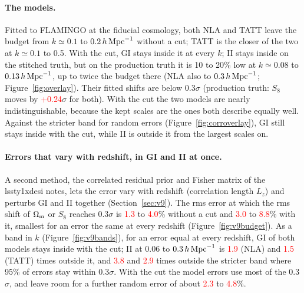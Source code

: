 \documentclass[11pt]{article}
\newcommand{\hMpc}{\,h\,{\rm Mpc}^{-1}}
\newcommand{\Om}{\Omega_{\rm m}}
\newif\ifnumbersfinal
\newcommand{\refresh}[1]{\ifnumbersfinal#1\else\textcolor{red}{#1}\fi}
\newcommand{\ProdNLAS}{\refresh{+0.24}}
\newcommand{\NineNoCutLo}{\refresh{1.3}}
\newcommand{\NineNoCutHi}{\refresh{4.0}}
\newcommand{\NineCutLo}{\refresh{3.0}}
\newcommand{\NineCutHi}{\refresh{8.8}}
\newcommand{\NineNLAII}{\refresh{1.9}}
\newcommand{\NineTATTII}{\refresh{1.5}}
\newcommand{\NineNLAIIn}{\refresh{3.8}}
\newcommand{\NineTATTIIn}{\refresh{2.9}}
\newcommand{\NineRoomProd}{\refresh{4.8}}
\newcommand{\NineRoomSNLA}{\refresh{2.3}}
\newcommand{\Tol}{0.3}
\begin{document}
\paragraph{The models.}
Fitted to FLAMINGO at the fiducial cosmology, both NLA and TATT leave the
budget from $k \simeq 0.1$ to $0.2\hMpc$ without a cut; TATT is the closer
of the two at $k \simeq 0.1$ to 0.5. With the cut, GI stays inside it at
every $k$; II stays inside on the stitched truth, but on the production truth
it is 10 to 20\% low at $k \simeq 0.08$ to $0.13\hMpc$, up to twice the
budget there (NLA also to $0.3\hMpc$; Figure~\ref{fig:overlay}). Their
fitted shifts are below \Tol$\sigma$ (production truth: $S_8$ moves by
\ProdNLAS$\sigma$ for both). With the cut the two models are nearly
indistinguishable, because the kept scales are the ones both describe
equally well. Against the stricter band for random errors
(Figure~\ref{fig:corroverlay}), GI still stays inside with the cut, while
II is outside it from the largest scales on.

\paragraph{Errors that vary with redshift, in GI and II at once.}
A second method, the correlated residual prior and Fisher matrix of the
lssty1xdesi notes, lets the error vary with redshift (correlation length
$L_z$) and perturbs GI and II together (Section~\ref{sec:v9}). The rms
error at which the rms shift of $\Om$ or $S_8$ reaches \Tol$\sigma$ is
\NineNoCutLo{} to \NineNoCutHi\% without a cut and \NineCutLo{} to
\NineCutHi\% with it, smallest for an error the same at every redshift
(Figure~\ref{fig:v9budget}). As a band in $k$ (Figure~\ref{fig:v9bands}),
for an error equal at every redshift, GI of both models stays inside with
the cut; II at 0.06 to $0.3\hMpc$ is \NineNLAII{} (NLA) and \NineTATTII{}
(TATT) times outside it, and \NineNLAIIn{} and \NineTATTIIn{} times outside
the stricter band where 95\% of errors stay within \Tol$\sigma$. With the
cut the model errors use most of the \Tol$\sigma$, and leave room for a
further random error of about \NineRoomSNLA{} to \NineRoomProd\%.
\end{document}
